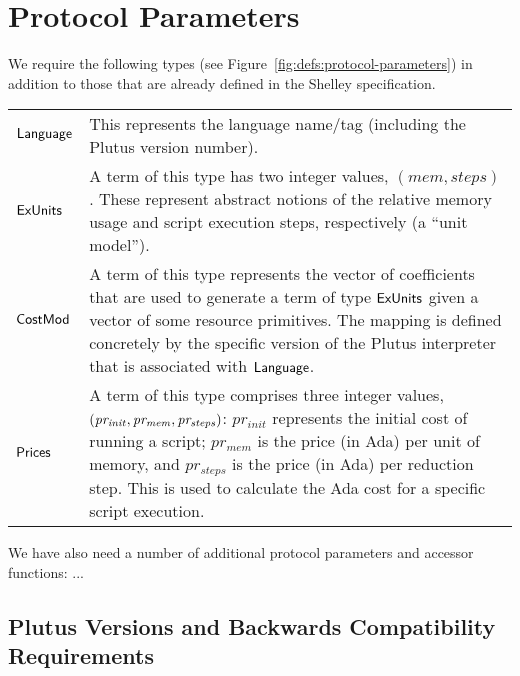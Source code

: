 \section{Protocol Parameters}
\label{sec:protocol-parameters}

We require the following types (see Figure~\ref{fig:defs:protocol-parameters})
in addition to those that are already defined in the Shelley specification.

\vspace{12pt}
\begin{tabular}{lp{5in}}
  $\mathsf{Language}$ &
  This represents the language name/tag (including the Plutus
  version number).
  \\
  $\mathsf{ExUnits}$ &
  A term of this type has two integer values,
  $(mem, steps)$.
  These represent abstract notions of the relative memory usage and script execution steps,
  respectively (a ``unit model'').
  \\
  $\mathsf{CostMod}$ &
  A term of this type represents the vector of coefficients that are used to generate
  a term of type $\mathsf{ExUnits}$ given a vector of some resource primitives.  The mapping is defined
  concretely by the specific version of the Plutus interpreter that is associated with $\mathsf{Language}$.
  \\
  $\mathsf{Prices}$ &
  A term of this type comprises three integer values,
  $\mathit{(pr_{init}, pr_{mem}, pr_{steps})}$: $pr_{init}$ represents the initial
  cost of running a script; $pr_{mem}$ is the price (in Ada) per unit of memory, and $pr_{steps}$ is the price (in Ada) per
  reduction step. This is used to calculate the Ada cost for a specific script execution.
\end{tabular}
\vspace{12pt}



We have also need a number of additional protocol parameters and accessor functions: ...

\subsection{Plutus Versions and Backwards Compatibility Requirements}
\label{sec:versions}

